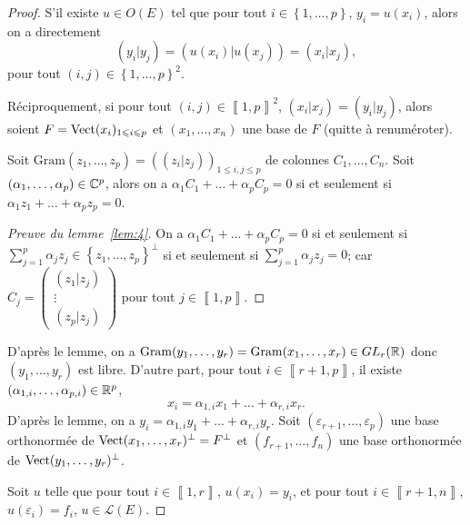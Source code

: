 \documentclass[12pt]{article}
\begin{document}
\begin{proof}
	S'il existe $u\in O(E)$ tel que pour tout $i\in\left\lbrace1,\dots,p\right\rbrace$, $y_i=u(x_i)$, alors on a directement 
	\begin{equation}
		(y_i|y_j)=(u(x_i)|u(x_j))=(x_i|x_j),
	\end{equation}
	pour tout $(i,j)\in\left\lbrace1,\dots,p\right\rbrace^{2}$.

	Réciproquement, si pour tout $(i,j)\in\left\llbracket1,p\right\rrbracket^{2}$, $(x_i|x_j)=(y_i|y_j)$, alors soient $F=\operatorname{Vect}(x_{i})_{1\leqslant i\leqslant p}$ et $(x_1,\dots,x_n)$ une base de $F$ (quitte à renuméroter).

	\begin{lemma}
		\label{lem:4}
		Soit $\mathrm{Gram}(z_1,\dots,z_p)=((z_i|z_j))_{1\leqslant i,j\leqslant p}$ de colonnes $C_1,\dots,C_n$. Soit $(\alpha_{1},\dots,\alpha_{p})\in\mathbb{C}^{p}$, alors on a $\alpha_{1}C_1+\dots+\alpha_{p}C_p=0$ si et seulement si $\alpha_{1}z_{1}+\dots+\alpha_{p}z_{p}=0$.
	\end{lemma}
	\begin{proof}[Preuve du lemme~\ref{lem:4}]
		On a $\alpha_{1}C_{1}+\dots+\alpha_{p}C_{p}=0$ si et seulement si $\sum_{j=1}^{p}\alpha_{j}z_{j}\in\left\lbrace z_1,\dots,z_p\right\rbrace^{\perp}$ si et seulement si $\sum_{j=1}^{p}\alpha_j z_j=0$; car $C_j=\begin{pmatrix}
			(z_1|z_j)\\\vdots\\(z_p|z_j)
		\end{pmatrix}$ pour tout $j\in\left\llbracket1,p\right\rrbracket$.
	\end{proof}

	D'après le lemme, on a $\mathrm{Gram}(y_1,\dots,y_r)=\mathrm{Gram}(x_1,\dots,x_r)\in GL_r(\mathbb{R})$ donc $(y_1,\dots,y_r)$ est libre. D'autre part, pour tout $i\in\left\llbracket r+1,p\right\rrbracket$, il existe $(\alpha_{1,i},\dots,\alpha_{p,i})\in\mathbb{R}^{p}$,
	\begin{equation}
		x_i=\alpha_{1,i}x_1+\dots+\alpha_{r,i}x_r.
	\end{equation}
	D'après le lemme, on a $y_i=\alpha_{1,i}y_1+\dots+\alpha_{r,i}y_r$. Soit $(\varepsilon_{r+1},\dots,\varepsilon_p)$ une base orthonormée de $\operatorname{Vect}(x_{1},\dots,x_r)^{\perp}=F^{\perp}$ et $(f_{r+1},\dots,f_{n})$ une base orthonormée de $\operatorname{Vect}(y_1,\dots,y_r)^{\perp}$.

	Soit $u$ telle que pour tout $i\in\left\llbracket1,r\right\rrbracket$, $u(x_i)=y_i$, et pour tout $i\in\left\llbracket r+1,n\right\rrbracket$, $u(\varepsilon_i)=f_i$, $u\in\mathcal{L}(E)$.


\end{proof}
\end{document}
